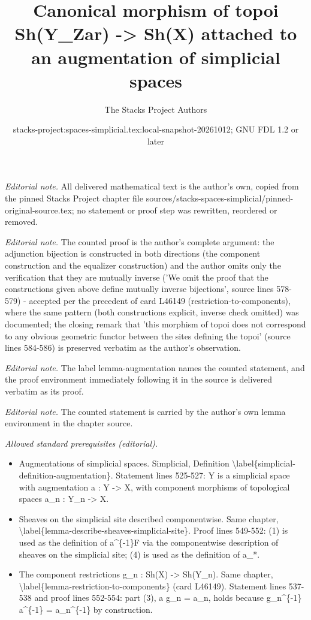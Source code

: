 \documentclass{stacks-project}
\title{Canonical morphism of topoi Sh(Y\_Zar) -> Sh(X) attached to an augmentation of simplicial spaces}
\author{The Stacks Project Authors}
\date{stacks-project:spaces-simplicial.tex:local-snapshot-20261012; GNU FDL 1.2 or later}
\theoremstyle{plain}
\theoremstyle{definition}
\theoremstyle{remark}
\numberwithin{equation}{subsection}
\begin{document}
\maketitle
\noindent\textit{Editorial note.} All delivered mathematical text is the author's own, copied from the pinned Stacks Project chapter file sources/stacks-spaces-simplicial/pinned-original-source.tex; no statement or proof step was rewritten, reordered or removed.\par\medskip
\noindent\textit{Editorial note.} The counted proof is the author's complete argument: the adjunction bijection is constructed in both directions (the component construction and the equalizer construction) and the author omits only the verification that they are mutually inverse ('We omit the proof that the constructions given above define mutually inverse bijections', source lines 578-579) - accepted per the precedent of card L46149 (restriction-to-components), where the same pattern (both constructions explicit, inverse check omitted) was documented; the closing remark that 'this morphism of topoi does not correspond to any obvious geometric functor between the sites defining the topoi' (source lines 584-586) is preserved verbatim as the author's observation.\par\medskip
\noindent\textit{Editorial note.} The label lemma-augmentation names the counted statement, and the proof environment immediately following it in the source is delivered verbatim as its proof.\par\medskip
\noindent\textit{Editorial note.} The counted statement is carried by the author's own lemma environment in the chapter source.\par\medskip
\noindent\textit{Allowed standard prerequisites (editorial).}\begin{itemize}
\item Augmentations of simplicial spaces. Simplicial, Definition \textbackslash{}label\{simplicial-definition-augmentation\}. Statement lines 525-527: Y is a simplicial space with augmentation a : Y -> X, with component morphisms of topological spaces a\_n : Y\_n -> X.
\item Sheaves on the simplicial site described componentwise. Same chapter, \textbackslash{}label\{lemma-describe-sheaves-simplicial-site\}. Proof lines 549-552: (1) is used as the definition of a\textasciicircum{}\{-1\}F via the componentwise description of sheaves on the simplicial site; (4) is used as the definition of a\_*.
\item The component restrictions g\_n : Sh(X) -> Sh(Y\_n). Same chapter, \textbackslash{}label\{lemma-restriction-to-components\} (card L46149). Statement lines 537-538 and proof lines 552-554: part (3), a g\_n = a\_n, holds because g\_n\textasciicircum{}\{-1\} a\textasciicircum{}\{-1\} = a\_n\textasciicircum{}\{-1\} by construction.
\end{itemize}\medskip
\end{document}
